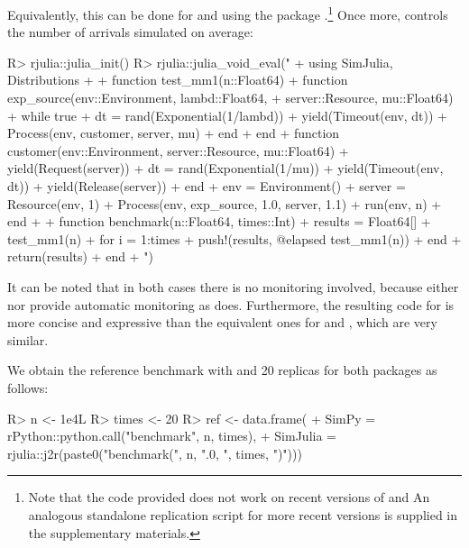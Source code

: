 \documentclass[
  nojss]{jss}
\begin{document}
Equivalently, this can be done for  and 
using the  package \citep{GitHub:rJulia}.\footnote{Note that
  the code provided does not work on recent versions of 
  and  An analogous standalone replication script for more
  recent versions is supplied in the supplementary materials.} Once
more,  controls the number of arrivals simulated on average:

\begin{CodeChunk}
\begin{CodeInput}
R> rjulia::julia_init()
R> rjulia::julia_void_eval("
+ using SimJulia, Distributions
+ 
+ function test_mm1(n::Float64)
+   function exp_source(env::Environment, lambd::Float64,
+                       server::Resource, mu::Float64)
+     while true
+       dt = rand(Exponential(1/lambd))
+       yield(Timeout(env, dt))
+       Process(env, customer, server, mu)
+     end
+   end
+   function customer(env::Environment, server::Resource, mu::Float64)
+     yield(Request(server))
+     dt = rand(Exponential(1/mu))
+     yield(Timeout(env, dt))
+     yield(Release(server))
+   end
+   env = Environment()
+   server = Resource(env, 1)
+   Process(env, exp_source, 1.0, server, 1.1)
+   run(env, n)
+ end
+ 
+ function benchmark(n::Float64, times::Int)
+   results = Float64[]
+   test_mm1(n)
+   for i = 1:times
+     push!(results, @elapsed test_mm1(n))
+   end
+   return(results)
+ end
+ ")
\end{CodeInput}
\end{CodeChunk}

It can be noted that in both cases there is no monitoring involved,
because either  nor  provide automatic
monitoring as  does. Furthermore, the resulting code for
 is more concise and expressive than the equivalent ones for
 and , which are very similar.

We obtain the reference benchmark with  and 20 replicas for
both packages as follows:

\begin{CodeChunk}
\begin{CodeInput}
R> n <- 1e4L
R> times <- 20
R> ref <- data.frame(
+   SimPy = rPython::python.call("benchmark", n, times),
+   SimJulia = rjulia::j2r(paste0("benchmark(", n, ".0, ", times, ")")))
\end{CodeInput}
\end{CodeChunk}
\end{document}
